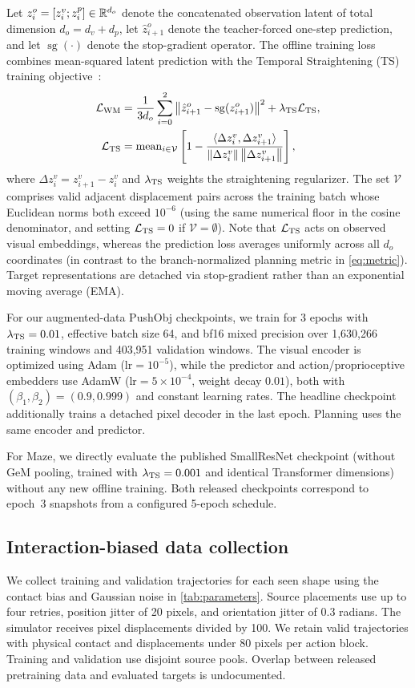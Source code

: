 Let $z_i^o=[z_i^v;z_i^p]\in\mathbb{R}^{d_o}$ denote the concatenated observation latent of total dimension $d_o=d_v+d_p$, let $\hat z_{i+1}^o$ denote the teacher-forced one-step prediction, and let $\operatorname{sg}(\cdot)$ denote the stop-gradient operator. The offline training loss combines mean-squared latent prediction with the Temporal Straightening (TS) training objective~\cite{wang2026straightening}:
\begin{align}
 \mathcal L_{\rm WM}&=\frac{1}{3d_o}\sum_{i=0}^{2}
 \left\lVert\hat z_{i+1}^o-\operatorname{sg}(z_{i+1}^o)\right\rVert^2
 +\lambda_{\rm TS}\mathcal L_{\rm TS},\\
 \mathcal L_{\rm TS}&=\operatorname{mean}_{i\in\mathcal V}
 \left[1-\frac{\langle\Delta z_i^v,\Delta z_{i+1}^v\rangle}
 {\left\lVert\Delta z_i^v\right\rVert\left\lVert\Delta z_{i+1}^v\right\rVert}\right],
\end{align}
where $\Delta z_i^v=z_{i+1}^v-z_i^v$ and $\lambda_{\rm TS}$ weights the straightening regularizer. The set $\mathcal V$ comprises valid adjacent displacement pairs across the training batch whose Euclidean norms both exceed $10^{-6}$ (using the same numerical floor in the cosine denominator, and setting $\mathcal L_{\rm TS}=0$ if $\mathcal V=\emptyset$). Note that $\mathcal L_{\rm TS}$ acts on observed visual embeddings, whereas the prediction loss averages uniformly across all $d_o$ coordinates (in contrast to the branch-normalized planning metric in \cref{eq:metric}). Target representations are detached via stop-gradient rather than an exponential moving average (EMA).

For our augmented-data PushObj checkpoints, we train for 3 epochs with $\lambda_{\rm TS}=0.01$, effective batch size 64, and bf16 mixed precision over 1,630,266 training windows and 403,951 validation windows. The visual encoder is optimized using Adam ($\text{lr}=10^{-5}$), while the predictor and action/proprioceptive embedders use AdamW ($\text{lr}=5\times10^{-4}$, weight decay $0.01$), both with $(\beta_1,\beta_2)=(0.9,0.999)$ and constant learning rates. The headline checkpoint additionally trains a detached pixel decoder in the last epoch. Planning uses the same encoder and predictor.

For Maze, we directly evaluate the published SmallResNet checkpoint (without GeM pooling, trained with $\lambda_{\rm TS}=0.001$ and identical Transformer dimensions) without any new offline training. Both released checkpoints correspond to epoch~3 snapshots from a configured 5-epoch schedule.

\subsection{Interaction-biased data collection}
We collect training and validation trajectories for each seen shape using the contact bias and Gaussian noise in \cref{tab:parameters}. Source placements use up to four retries, position jitter of 20 pixels, and orientation jitter of 0.3 radians. The simulator receives pixel displacements divided by 100. We retain valid trajectories with physical contact and displacements under 80 pixels per action block. Training and validation use disjoint source pools. Overlap between released pretraining data and evaluated targets is undocumented.

